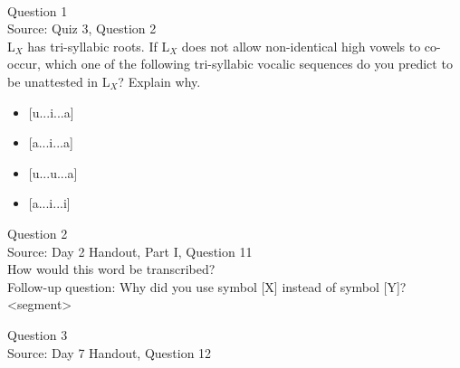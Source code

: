 \documentclass[12pt]{article}
\begin{document}
\newpage

\begin{center}
\textbf{{\color{red}{\HUGE END OF EXAM}}}\\

\end{center}
\newpage

\begin{center}
\textbf{{\color{blue}{\HUGE START OF EXAM\\}}}

\textbf{{\color{blue}{\HUGE Student ID: 1794\\}}}

\textbf{{\color{blue}{\HUGE 12:15 PM - 12:30 PM\\}}}

\end{center}
\newpage

{\large Question 1}\\

Source: Quiz 3, Question 2\\

L$_X$ has tri-syllabic roots. If L$_X$ does not allow non-identical high vowels to co-occur, which one of the following tri-syllabic vocalic sequences do you predict to be unattested in L$_X$? Explain why.\\

\begin{itemize} \item {[u...i...a]} \item {[a...i...a]} \item {[u...u...a]} \item {[a...i...i]} \end{itemize}


\newpage

{\large Question 2}\\

Source: Day 2 Handout, Part I, Question 11\\

How would this word be transcribed?\\ Follow-up question: Why did you use symbol [X] instead of symbol [Y]?\\

<segment>


\newpage

{\large Question 3}\\

Source: Day 7 Handout, Question 12\\
\end{document}
